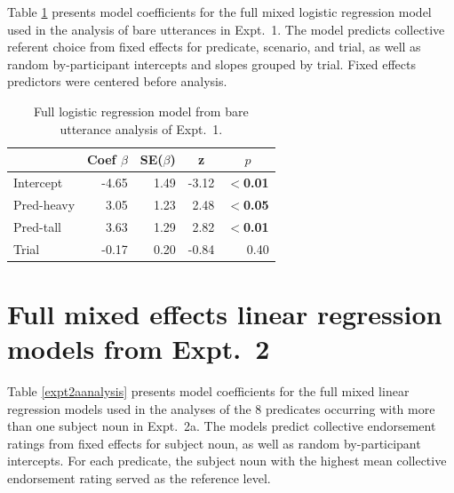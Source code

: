 \documentclass[linguex]{sp}
\begin{document}
Table \ref{expt1analysis2} presents model coefficients for the full mixed logistic regression model used in the analysis of bare utterances in Expt.~1. The model predicts collective referent choice from fixed effects for predicate, scenario, and trial, as well as random by-participant intercepts and slopes grouped by trial. Fixed effects predictors were centered before analysis.


\begin{table}[htb] 
	\centering \caption{Full logistic regression model from bare utterance analysis of Expt.~1.} \label{expt1analysis2}
	\begin{tabular}{lrrrr}\toprule
		&	Coef $\beta$	&	SE($\beta$)	&	\multicolumn{1}{c}{ \textbf{z}}	&	\multicolumn{1}{c}{$p$}\\ \midrule
		Intercept	&	-4.65	&	1.49	&	-3.12	&	\textbf{$<$0.01}\\
		Pred-heavy	&	3.05	&	1.23	&	2.48	&	\textbf{$<$0.05}\\
		Pred-tall	&	3.63	&	1.29	&	2.82	&	\textbf{$<$0.01}\\
		Trial	&	-0.17	&	0.20	&	-0.84	&	0.40\\
		\bottomrule
	\end{tabular}
\end{table}
 

\section{Full mixed effects linear regression models from Expt.~2}\label{2-stats}

Table \ref{expt2aanalysis} presents model coefficients for the full mixed linear regression models used in the analyses of the 8 predicates occurring with more than one subject noun in Expt.~2a. The models predict collective endorsement ratings from fixed effects for subject noun, as well as random by-participant intercepts. For each predicate, the subject noun with the highest mean collective endorsement rating served as the reference level.
\end{document}
